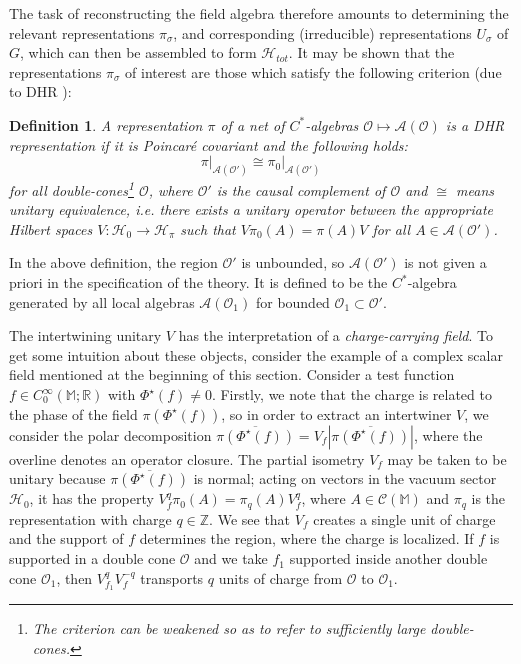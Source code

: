 \documentclass[12pt,a4paper]{article}
\newcommand{\1}{\mathds{1}}                         %
\newcommand{\ZZ}{\mathbb{Z}} %
\newcommand{\RR}{\mathbb{R}}           %
\newcommand{\M}{\mathbb{M}} 	     %
\newcommand{\Hcal}{\mathcal {H}}
\newcommand{\Ocal}{\mathcal{O}}
\newcommand{\MM}{\mathbb{M}}
\newcommand{\HH}{{\mathcal{H}}}
\newcommand{\Ac}{{\mathcal{A}}}
\newcommand{\Cc}{{\mathcal{C}}}
\newcommand{\CoinX}[1]{C_0^\infty(#1)}
\newcommand{\be}{\begin{equation}}
\newcommand{\ee}{\end{equation}}
\newtheorem{df}[theorem]{Definition}}
\begin{document}
The task of reconstructing the field algebra therefore amounts to determining the relevant representations $\pi_\sigma$, and corresponding (irreducible) representations $U_\sigma$ of $G$, which
can then be assembled to form $\Hcal_{tot}$. It may be shown that the representations $\pi_\sigma$ of interest are those which satisfy the following criterion (due to DHR \cite{DHR3}):
\vskip 0.1in
\begin{df}
	A representation $\pi$ of a net of $C^*$-algebras $\Ocal\mapsto\Ac(\Ocal)$ is a \emph{DHR representation} if it is Poincar\'e covariant and the following holds:
	\be\label{DHRcrit}
	\pi\big|_{\Ac(\Ocal')}\cong \pi_0\big|_{\Ac(\Ocal')}
	\ee
	for all double-cones\footnote{The criterion can be weakened so as to refer to sufficiently large double-cones.} $\Ocal$, where $\Ocal'$ is the causal complement of $\Ocal$ and $\cong$ means unitary equivalence, i.e. there exists a unitary operator between the appropriate Hilbert spaces $V:\Hcal_{0}\rightarrow \Hcal_{\pi}$ such that $V\pi_0(A)=\pi(A) V$ for all $A\in \Ac(\Ocal')$.
\end{df}
In the above definition, the region $\Ocal'$ is unbounded, so $\Ac(\Ocal')$ is not given a priori in the specification of the theory. It is defined to be the $C^*$-algebra generated by all local algebras $\Ac(\Ocal_1)$ for bounded $\Ocal_1\subset \Ocal'$. 

The intertwining unitary $V$ has the interpretation of a \emph{charge-carrying field}. To get some intuition about these objects, consider the example of a complex scalar field mentioned at the beginning of this section.
Consider a test function $f\in\CoinX{\MM;\RR}$ with $\Phi^\star(f)\neq 0$. Firstly, we note that the charge is related to the phase of the field $\pi(\Phi^\star(f))$, so in order to extract an intertwiner $V$, we consider the polar decomposition $\overline{\pi(\Phi^\star(f))}=V_f |\overline{\pi(\Phi^\star(f))}|$, where the overline denotes an operator closure. The partial isometry $V_f$ may be taken to be unitary because $\overline{\pi(\Phi^\star(f))}$ is normal; acting on vectors in the vacuum sector $\HH_0$, it has the property $V_f^q \pi_0(A)= \pi_q(A)V_f^q$, where $A\in\Cc(\M)$ and $\pi_q$ is the representation with charge $q\in\ZZ$. We see that $V_f$ creates a single unit of charge and the support of $f$ determines the region, where the charge is localized. If $f$ is supported in a double cone $\Ocal$ and we take $f_1$ supported inside another double cone $\Ocal_1$, then $V_{f_1}^q V_f^{-q}$ transports $q$ units of charge from $\Ocal$ to $\Ocal_1$. 
\end{document}
